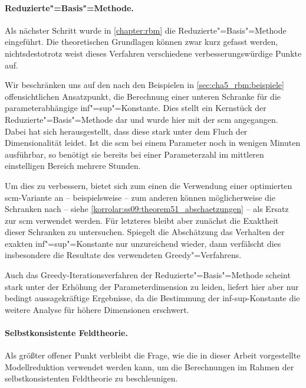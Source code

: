 \documentclass[../main.tex]{subfiles}
\begin{document}
\paragraph{Reduzierte"=Basis"=Methode.} %
\label{par:reduzierte_basis_methode}

Als nächster Schritt wurde in \cref{chapter:rbm} die Reduzierte"=Basis"=Methode eingeführt.
Die theoretischen Grundlagen können zwar kurz gefasst werden, nichtsdestotrotz weist dieses Verfahren verschiedene verbesserungswürdige Punkte auf.

Wir beschränken uns auf den nach den Beispielen in \cref{sec:cha5_rbm:beispiele} offensichtlichen Ansatzpunkt, die Berechnung einer unteren Schranke für die parameterabhängige inf"=sup"=Konstante.
Dies stellt ein Kernstück der Reduzierte"=Basis"=Methode dar und wurde hier mit der \acl{scm} angegangen.
Dabei hat sich herausgestellt, dass diese stark unter dem Fluch der Dimensionalität leidet.
Ist die \ac{scm} bei einem Parameter noch in wenigen Minuten ausführbar, so benötigt sie bereits bei einer Parameterzahl im mittleren einstelligen Bereich mehrere Stunden.

Um dies zu verbessern, bietet sich zum einen die Verwendung einer optimierten \ac{scm}-Variante an -- beispielsweise \cite{Huynh2010} -- zum anderen können möglicherweise die Schranken nach \cite{Schwab:2009ec} -- siehe \cref{korrolar:ss09:theorem51_abschaetzungen} -- als Ersatz zur \ac{scm} verwendet werden.
Für letzteres bleibt aber zunächst die Exaktheit dieser Schranken zu untersuchen.
Spiegelt die Abschätzung das Verhalten der exakten inf"=sup"=Konstante nur unzureichend wieder, dann verfälscht dies insbesondere die Resultate des verwendeten Greedy"=Verfahrens.

Auch das Greedy-Iterationsverfahren der Reduzierte"=Basis"=Methode scheint stark unter der Erhöhung der Parameterdimension zu leiden, liefert hier aber nur bedingt aussagekräftige Ergebnisse, da die Bestimmung der inf-sup-Konstante die weitere Analyse für höhere Dimensionen erschwert.

\paragraph{Selbstkonsistente Feldtheorie.} %
\label{par:selbstkonsistente_feldtheorie}

Als größter offener Punkt verbleibt die Frage, wie die in dieser Arbeit vorgestellte Modellreduktion verwendet werden kann, um die Berechnungen im Rahmen der selbstkonsistenten Feldtheorie zu beschleunigen.
\end{document}
